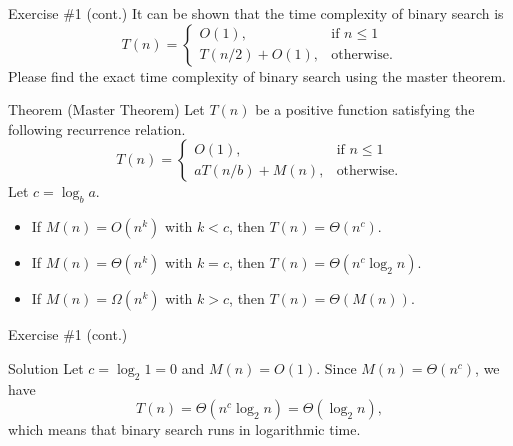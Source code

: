 \documentclass{beamer}
\begin{document}
\begin{frame}[fragile]{Exercise \#1 (cont.)}
  It can be shown that the time complexity of binary search is
  \begin{equation*}
    T(n) =
    \begin{cases}
      O(1), & \text{if $n \leq 1$} \\
      T(n / 2) + O(1), & \text{otherwise}.
    \end{cases}
  \end{equation*}
  \pause
  Please find the exact time complexity of binary search using the master
  theorem.
  \begin{block}{\scriptsize Theorem (Master Theorem)}
    \scriptsize
    Let $T(n)$ be a positive function satisfying the following recurrence
    relation.
    \begin{equation*}
      T(n) =
      \begin{cases}
        O(1), & \text{if $n \leq 1$} \\
        aT(n / b) + M(n), & \text{otherwise}.
      \end{cases}
    \end{equation*}
    Let $c = \log_b a$.
    \begin{itemize}
      \item If $M(n) = O(n^k)$ with $k < c$, then $T(n) = \Theta(n^c)$.
      \item If $M(n) = \Theta(n^k)$ with $k = c$,
      then $T(n) = \Theta(n^c \log_2 n)$.
      \item If $M(n) = \Omega(n^k)$ with $k > c$, then $T(n) = \Theta(M(n))$.
    \end{itemize}
  \end{block}
\end{frame}

\begin{frame}{Exercise \#1 (cont.)}
  \begin{block}{Solution}
    Let $c = \log_2 1 = 0$ and $M(n) = O(1)$.
    Since $M(n) = \Theta(n^c)$, we have
    \begin{equation*}
      T(n) = \Theta(n^c \log_2 n) = \Theta(\log_2 n),
    \end{equation*}
    which means that binary search runs in logarithmic time.
  \end{block}
\end{frame}
\end{document}
